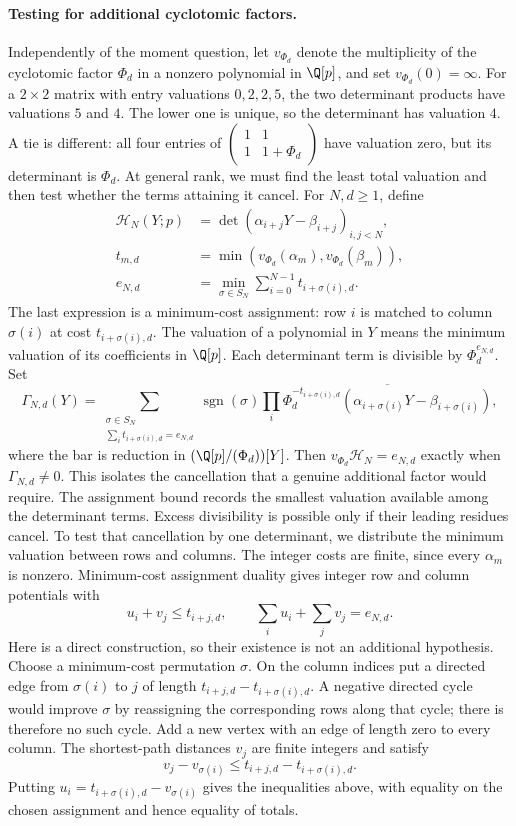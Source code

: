\paragraph{Testing for additional cyclotomic factors.}
Independently of the moment question, let $v_{\Phi_d}$ denote the
multiplicity of the cyclotomic factor $\Phi_d$ in a nonzero polynomial
in $\Q[p]$, and set $v_{\Phi_d}(0)=\infty$.
For a $2\times2$ matrix with entry valuations $0,2,2,5$, the two
determinant products have valuations $5$ and $4$. The lower one is
unique, so the determinant has valuation $4$. A tie is different:
all four entries of
$\left(\begin{smallmatrix}1&1\\1&1+\Phi_d\end{smallmatrix}\right)$
have valuation zero, but its determinant is $\Phi_d$.
At general rank, we must find the least total valuation and then test
whether the terms attaining it cancel. For $N,d\ge1$, define
\[
 \begin{aligned}
 \mathcal H_N(Y;p)&=\det(\alpha_{i+j}Y-\beta_{i+j})_{i,j<N},\\
 t_{m,d}&=\min(v_{\Phi_d}(\alpha_m),v_{\Phi_d}(\beta_m)),\\
 e_{N,d}&=\min_{\sigma\in S_N}\sum_{i=0}^{N-1}t_{i+\sigma(i),d}.
 \end{aligned}
\]
The last expression is a minimum-cost assignment: row $i$ is matched
to column $\sigma(i)$ at cost $t_{i+\sigma(i),d}$.
The valuation of a polynomial in $Y$ means the minimum valuation of
its coefficients in $\Q[p]$. Each determinant term is
divisible by $\Phi_d^{e_{N,d}}$. Set
\[
 \Gamma_{N,d}(Y)=
 \sum_{\substack{\sigma\in S_N\\\sum_i t_{i+\sigma(i),d}=e_{N,d}}}
 \operatorname{sgn}(\sigma)
 \prod_i\overline{\Phi_d^{-t_{i+\sigma(i),d}}
        (\alpha_{i+\sigma(i)}Y-\beta_{i+\sigma(i)})},
\]
where the bar is reduction in $(\Q[p]/(\Phi_d))[Y]$.
Then $v_{\Phi_d}\mathcal H_N=e_{N,d}$ exactly when
$\Gamma_{N,d}\ne0$. This isolates the cancellation that a genuine
additional factor would require.
The assignment bound records the smallest valuation available among
the determinant terms. Excess divisibility is possible only if their
leading residues cancel. To test that cancellation by one determinant,
we distribute the minimum valuation between rows and columns.
The integer costs are finite, since every $\alpha_m$ is nonzero. Minimum-cost assignment duality gives
integer row and column potentials with
\[
 u_i+v_j\le t_{i+j,d},\qquad
 \sum_i u_i+\sum_jv_j=e_{N,d}.
\]
Here is a direct construction, so their existence is not an additional
hypothesis. Choose a minimum-cost permutation $\sigma$. On the column
indices put a directed edge from $\sigma(i)$ to $j$ of length
$t_{i+j,d}-t_{i+\sigma(i),d}$. A negative directed cycle would improve
$\sigma$ by reassigning the corresponding rows along that cycle;
there is therefore no such cycle. Add a new vertex with an edge of
length zero to every column. The shortest-path distances $v_j$ are
finite integers and satisfy
\[
 v_j-v_{\sigma(i)}\le t_{i+j,d}-t_{i+\sigma(i),d}.
\]
Putting $u_i=t_{i+\sigma(i),d}-v_{\sigma(i)}$ gives the inequalities
above, with equality on the chosen assignment and hence equality of
totals.

